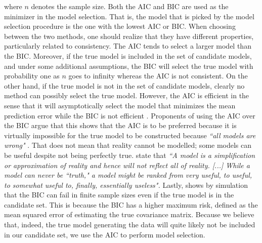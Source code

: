 \documentclass[12pt]{article}
\begin{document}
	where $n$ denotes the sample size. Both the AIC and BIC are used as the minimizer in the model selection. That is, the model that is picked by the model selection procedure is the one with the lowest AIC or BIC. When choosing between the two methods, one should realize that they have different properties, particularly related to consistency. The AIC tends to select a larger model than the BIC. Moreover, if the true model is included in the set of candidate models, and under some additional assumptions, the BIC will select the true model with probability one as $n$ goes to infinity whereas the AIC is not consistent. On the other hand, if the true model is not in the set of candidate models, clearly no method can possibly select the true model. However, the AIC is efficient in the sense that it will asymptotically select the model that minimizes the mean prediction error while the BIC is not efficient \parencite{vrieze2012model}. Proponents of using the AIC over the BIC argue that this shows that the AIC is to be preferred because it is virtually impossible for the true model to be constructed because \textit{``all models are wrong"} \parencite{box1976science}. That does not mean that reality cannot be modelled; some models can be useful despite not being perfectly true. \textcite{burnham2002practical} state that \textit{``A model is a simplification or approximation of reality and hence will not reflect all of reality. [...] While a model can never be ``truth," a model might be ranked from very useful, to useful, to somewhat useful to, finally, essentially useless".} Lastly, \textcite{vrieze2012model} shows by simulation that the BIC can fail in finite sample sizes even if the true model is in the candidate set. This is because the BIC has a higher maximum risk, defined as the mean squared error of estimating the true covariance matrix. Because we believe that, indeed, the true model generating the data will quite likely not be included in our candidate set, we use the AIC to perform model selection.
	
\end{document}
